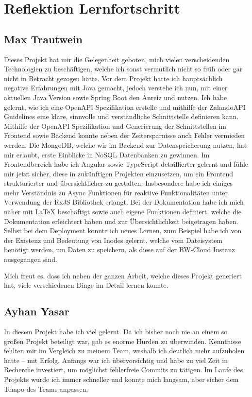 \chapter{Reflektion Lernfortschritt}\label{ch:reflektion-lernfortschritt}


\section{Max Trautwein}
Dieses Projekt hat mir die Gelegenheit geboten, mich vielen verscheidenden Technologien zu beschäftigen,
welche ich sonst vermutlich nicht so früh oder gar nicht in Betracht gezogen hätte.
Vor dem Projekt hatte ich hauptsächlich negative Erfahrungen mit Java gemacht,
jedoch verstehe ich nun, mit einer aktuellen Java Version sowie Spring Boot den Anreiz und nutzen.
Ich habe gelernt, wie ich eine OpenAPI Spezifikation erstelle und mithilfe der
ZalandoAPI Guidelines eine klare, sinnvolle und verständliche Schnittstelle definieren kann.
Mithilfe der OpenAPI Spezifikation und Generierung der Schnittstellen im Frontend sowie Backend
konnte neben der Zeitersparnisse auch Fehler vermieden werden.
Die MongoDB, welche wir im Backend zur Datenspeicherung nutzen, hat mir erlaubt,
erste Einblicke in NoSQL Datenbanken zu gewinnen.
Im Frontendbereich habe ich Angular sowie TypeScript detaillierter gelernt und fühle mir jetzt sicher,
diese in zukünftigen Projekten einzusetzen, um ein Frontend strukturierter und übersichtlicher zu gestalten.
Insbesondere habe ich einiges mehr Verständnis zu Async Funktionen für reaktive Funktionalitäten
unter Verwendung der RxJS Bibliothek erlangt.
Bei der Dokumentation habe ich mich näher mit LaTeX beschäftigt sowie auch eigene Funktionen definiert,
welche die Dokumentation erleichtert haben und zur Übersichtlichkeit beigetragen haben.
Selbst bei dem Deployment konnte ich neues Lernen, zum Beispiel habe ich von der Existenz und Bedeutung von Inodes gelernt,
welche vom Dateisystem benötigt werden, um Daten zu speichern, als diese auf der BW-Cloud Instanz ausgegangen sind.

Mich freut es, dass ich neben der ganzen Arbeit, welche dieses Projekt generiert hat,
viele verschiedenen Dinge im Detail lernen konnte.


\section{Ayhan Yasar}

In diesem Projekt habe ich viel gelernt. Da ich bisher noch nie an einem so großen Projekt beteiligt war, gab es enorme Hürden zu überwinden. 
Kenntnisse fehlten mir im Vergleich zu meinem Team, weshalb ich deutlich mehr aufzuholen hatte – mit Erfolg. 
Anfangs war ich übervorsichtig und habe zu viel Zeit in Recherche investiert, um möglichst fehlerfreie Commits zu tätigen. 
Im Laufe des Projekts wurde ich immer schneller und konnte mich langsam, aber sicher dem Tempo des Teams anpassen.

